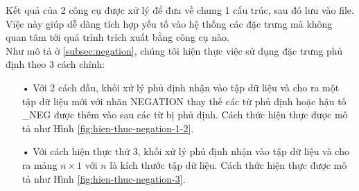 Kết quả của 2 công cụ được xử lý để đưa về chung 1 cấu trúc, sau đó lưu vào file. Việc này giúp dễ dàng tích hợp yếu tố vào hệ thống các đặc trưng mà không quan tâm tới quá trình trích xuất bằng công cụ nào.\\

Như mô tả ở \ref{subsec:negation}, chúng tôi hiện thực việc sử dụng đặc trưng phủ định theo 3 cách chính:
\begin{itemize}
\item[•] Với 2 cách đầu, khối xử lý phủ định nhận vào tập dữ liệu và cho ra một tập dữ liệu mới với nhãn NEGATION thay thế các từ phủ định hoặc hậu tố \_NEG được thêm vào sau các từ bị phủ định. Cách thức hiện thực được mô tả như Hình \ref{fig:hien-thuc-negation-1-2}.
\item[•] Với cách hiện thực thứ 3, khối xử lý phủ định nhận vào tập dữ liệu và cho ra mảng $n \times 1$ với $n$ là kích thước tập dữ liệu. Cách thức hiện thực được mô tả như Hình \ref{fig:hien-thuc-negation-3}.
\end{itemize}
